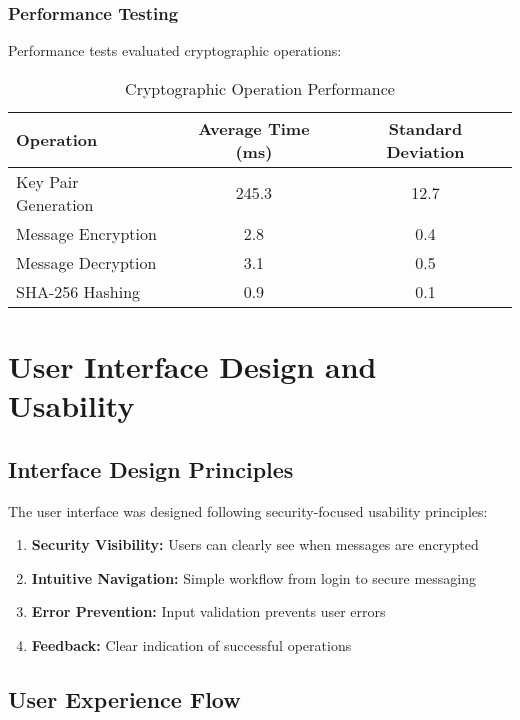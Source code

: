 \documentclass[12pt,a4paper]{article}
\begin{document}
\subsubsection{Performance Testing}

Performance tests evaluated cryptographic operations:

\begin{table}[H]
\centering
\begin{tabular}{|l|c|c|}
\hline
\textbf{Operation} & \textbf{Average Time (ms)} & \textbf{Standard Deviation} \\
\hline
Key Pair Generation & 245.3 & 12.7 \\
Message Encryption & 2.8 & 0.4 \\
Message Decryption & 3.1 & 0.5 \\
SHA-256 Hashing & 0.9 & 0.1 \\
\hline
\end{tabular}
\caption{Cryptographic Operation Performance}
\label{tab:performance}
\end{table}

\section{User Interface Design and Usability}

\subsection{Interface Design Principles}

The user interface was designed following security-focused usability principles:

\begin{enumerate}
    \item \textbf{Security Visibility:} Users can clearly see when messages are encrypted
    \item \textbf{Intuitive Navigation:} Simple workflow from login to secure messaging
    \item \textbf{Error Prevention:} Input validation prevents user errors
    \item \textbf{Feedback:} Clear indication of successful operations
\end{enumerate}

\subsection{User Experience Flow}
\end{document}
